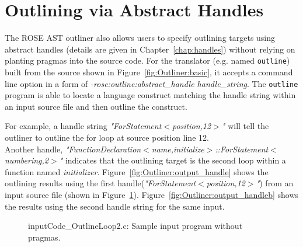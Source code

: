 \section{Outlining via Abstract Handles}
\label{sec:Outliner:handle}
The ROSE AST outliner also allows users to specify outlining targets using
abstract handles (details are given in Chapter~\ref{chap:handles}) without relying
on planting pragmas into the source code. 
For the translator (e.g. named \texttt{outline}) built from the source
shown in Figure~\ref{fig:Outliner:basic}, 
it accepts a command line option in a form of \textit{-rose:outline:abstract\_handle handle\_string}. 
The \texttt{outline} program is able to locate
a language construct matching the handle string within an input source file and then outline the construct. 

For example, a handle string \textit{"ForStatement$<$position,12$>$"} will tell the outliner to outline the for loop
at source position line 12. \\
Another handle,
\textit{"FunctionDeclaration$<$name,initialize$>$::ForStatement$<$numbering,2$>$"}
indicates that the outlining target is the second loop within a
function named \textit{initializer}. 
Figure~\ref{fig:Outliner:output_handle} shows the outlining results using the first handle(\textit{"ForStatement$<$position,12$>$"}) from an input source file  (shown in
Figure~\ref{fig:Outliner:input_handle}).
Figure~\ref{fig:Outliner:output_handleb} shows the results using the second
handle string for the same input.

\begin{figure}[!b]
{\indent
{\mySmallFontSize
\begin{latexonly}
   
\end{latexonly}
\begin{htmlonly}
   
\end{htmlonly}

}
}
\caption{inputCode\_OutlineLoop2.c: Sample input program without pragmas.}
\label{fig:Outliner:input_handle}
\end{figure}


